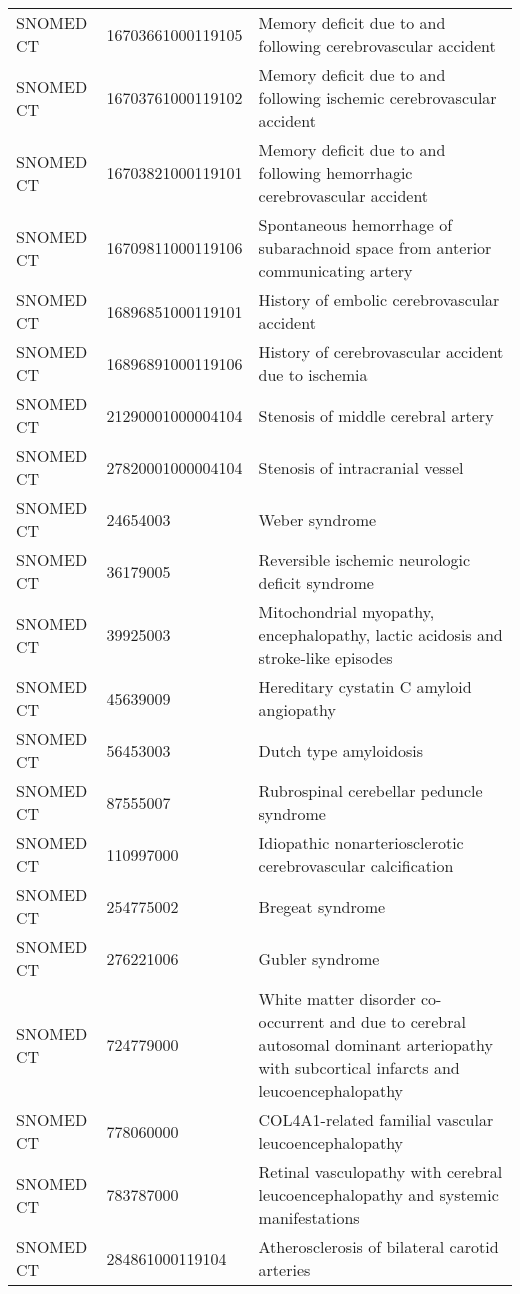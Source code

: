 \begin{longtable}{p{}p{}p{}}
  SNOMED CT & 16703661000119105 & Memory deficit due to and following cerebrovascular accident \\ 
  SNOMED CT & 16703761000119102 & Memory deficit due to and following ischemic cerebrovascular accident \\ 
  SNOMED CT & 16703821000119101 & Memory deficit due to and following hemorrhagic cerebrovascular accident \\ 
  SNOMED CT & 16709811000119106 & Spontaneous hemorrhage of subarachnoid space from anterior communicating artery \\ 
  SNOMED CT & 16896851000119101 & History of embolic cerebrovascular accident \\ 
  SNOMED CT & 16896891000119106 & History of cerebrovascular accident due to ischemia \\ 
  SNOMED CT & 21290001000004104 & Stenosis of middle cerebral artery \\ 
  SNOMED CT & 27820001000004104 & Stenosis of intracranial vessel \\ 
  SNOMED CT & 24654003 & Weber syndrome \\ 
  SNOMED CT & 36179005 & Reversible ischemic neurologic deficit syndrome \\ 
  SNOMED CT & 39925003 & Mitochondrial myopathy, encephalopathy, lactic acidosis and stroke-like episodes \\ 
  SNOMED CT & 45639009 & Hereditary cystatin C amyloid angiopathy \\ 
  SNOMED CT & 56453003 & Dutch type amyloidosis \\ 
  SNOMED CT & 87555007 & Rubrospinal cerebellar peduncle syndrome \\ 
  SNOMED CT & 110997000 & Idiopathic nonarteriosclerotic cerebrovascular calcification \\ 
  SNOMED CT & 254775002 & Bregeat syndrome \\ 
  SNOMED CT & 276221006 & Gubler syndrome \\ 
  SNOMED CT & 724779000 & White matter disorder co-occurrent and due to cerebral autosomal dominant arteriopathy with subcortical infarcts and leucoencephalopathy \\ 
  SNOMED CT & 778060000 & COL4A1-related familial vascular leucoencephalopathy \\ 
  SNOMED CT & 783787000 & Retinal vasculopathy with cerebral leucoencephalopathy and systemic manifestations \\ 
  SNOMED CT & 284861000119104 & Atherosclerosis of bilateral carotid arteries \\ 

\end{longtable}
